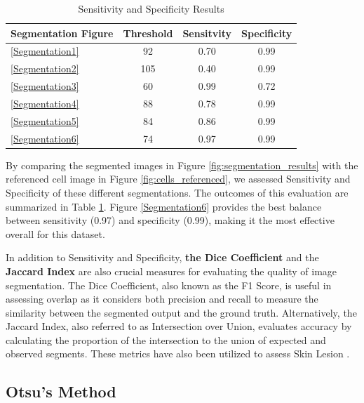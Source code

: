 \documentclass[%
	a4paper, %
	12pt, %
	english, %
	bibtotoc %
]{scrartcl}
\begin{document}
\begin{table}[H]
    \centering
    \begin{tabular}{l|c|c|c}
         \textbf{Segmentation Figure} & \textbf{Threshold} & \textbf{Sensitvity} & \textbf{Specificity} \\
    \hline
        \ref{Segmentation1} & 92 & 0.70 & 0.99 \\ \hline
        \ref{Segmentation2} & 105 & 0.40 & 0.99 \\ \hline
        \ref{Segmentation3} & 60 & 0.99 & 0.72 \\ \hline
        \ref{Segmentation4} & 88 & 0.78 & 0.99 \\ \hline
        \ref{Segmentation5} & 84 & 0.86 & 0.99 \\ \hline
        \ref{Segmentation6} & 74 & 0.97 & 0.99 \\ \hline
    \end{tabular}
    \caption{Sensitivity and Specificity Results}
    \label{tab:sensitivity_and_Specificity_results}
\end{table}

By comparing the segmented images in Figure \ref{fig:segmentation_results} with the referenced cell image in Figure \ref{fig:cells_referenced}, we assessed Sensitivity and Specificity of these different segmentations. The outcomes of this evaluation are summarized in Table \ref{tab:sensitivity_and_Specificity_results}. Figure \ref{Segmentation6} provides the best balance between sensitivity (0.97) and specificity (0.99), making it the most effective overall for this dataset. 

In addition to Sensitivity and Specificity, \textbf{the Dice Coefficient} and the \textbf{Jaccard Index} are also crucial measures for evaluating the quality of image segmentation. The Dice Coefficient, also known as the F1 Score, is useful in assessing overlap as it considers both precision and recall to measure the similarity between the segmented output and the ground truth. Alternatively, the Jaccard Index, also referred to as Intersection over Union, evaluates accuracy by calculating the proportion of the intersection to the union of expected and observed segments. These metrics have also been utilized to assess Skin Lesion \cite{setiawan_skin_lesion_metrics}.

\subsection{Otsu's Method}
\end{document}
